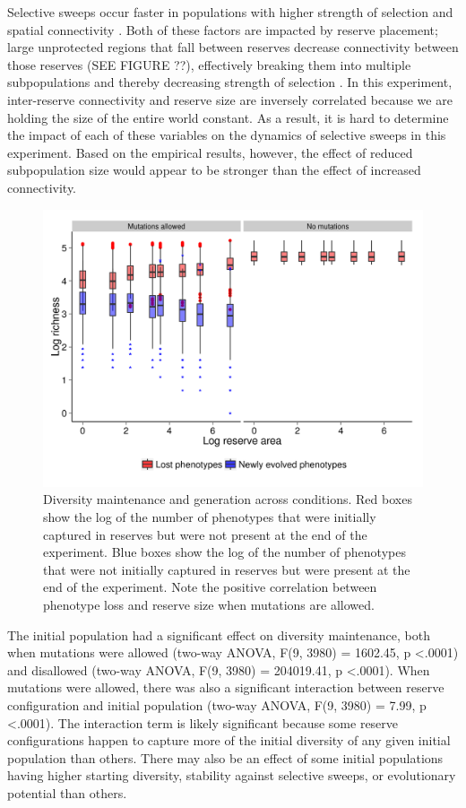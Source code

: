 \documentclass[letterpaper]{article}
\begin{document}
Selective sweeps occur faster in populations with higher strength of selection and spatial connectivity \citep{cantu-paz_migration_2001}. Both of these factors are impacted by reserve placement; large unprotected regions that fall between reserves decrease connectivity between those reserves (SEE FIGURE ??), effectively breaking them into multiple subpopulations and thereby decreasing strength of selection \citep{gavrilets_dynamic_2005}. In this experiment,  inter-reserve connectivity and reserve size are inversely correlated because we are holding the size of the entire world constant. As a result, it is hard to determine the impact of each of these variables on the dynamics of selective sweeps in this experiment. Based on the empirical results, however, the effect of reduced subpopulation size would appear to be stronger than the effect  of increased connectivity.
        
\begin{figure}[h]
	\centering
	\includegraphics[]{DiversityGenerationMaintenance.png}
    \caption{Diversity maintenance and generation across conditions. Red boxes show the log of the number of phenotypes that were initially captured in reserves but were not present at the end of the experiment. Blue boxes show the log of the number of phenotypes that were not initially captured in reserves but were present at the end of the experiment. Note the positive correlation between phenotype loss and reserve size when mutations are allowed.}
    \label{fig:diversitygenerationmaintenance}
\end{figure}

The initial population had a significant effect on diversity maintenance, both when mutations were allowed (two-way ANOVA, F(9, 3980) = 1602.45, p \textless .0001) and disallowed  (two-way ANOVA, F(9, 3980) = 204019.41, p \textless .0001). When mutations were allowed, there was also a significant interaction between reserve configuration and initial population (two-way ANOVA, F(9, 3980) = 7.99, p \textless .0001). The interaction term is likely significant because some reserve configurations happen to capture more of the initial diversity of any given initial population than others. There may also be an effect of some initial populations having higher starting diversity, stability against selective sweeps, or evolutionary potential than others. 
        
\end{document}
